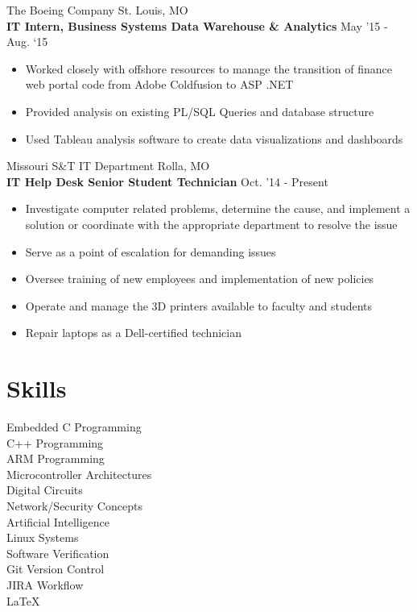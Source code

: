 \documentclass[resmargin]{res}
\begin{document}
\begin{resume}
\begin{itemize}
\end{itemize}

The Boeing Company \hfill St. Louis, MO\\
{\bf IT Intern, Business Systems Data Warehouse \& Analytics} \hfill May ’15 - Aug. ‘15
\begin{itemize}
	\item Worked closely with offshore resources to manage the transition of finance web portal code from Adobe Coldfusion to ASP .NET
	\item Provided analysis on existing PL/SQL Queries and database structure
	\item Used Tableau analysis software to create data visualizations and dashboards
\end{itemize}

Missouri S\&T IT Department \hfill Rolla, MO\\
{\bf IT Help Desk Senior Student Technician} \hfill Oct. ’14 - Present
\begin{itemize}
	\item Investigate computer related problems, determine the cause, and implement a solution or coordinate with the appropriate department to resolve the issue
	\item Serve as a point of escalation for demanding issues
	\item Oversee training of new employees and implementation of new policies
	\item Operate and manage the 3D printers available to faculty and students
	\item Repair laptops as a Dell-certified technician
\end{itemize}

\section{Skills}
\begin{multicols}{3}
	Embedded C Programming\\
	C++ Programming\\
	ARM Programming\\
	Microcontroller Architectures\\
	Digital Circuits\\
	Network/Security Concepts\\
	Artificial Intelligence\\
	Linux Systems\\
	Software Verification\\
	Git Version Control\\
	JIRA Workflow\\
	\LaTeX
\end{multicols}


\end{resume}
\end{document}
